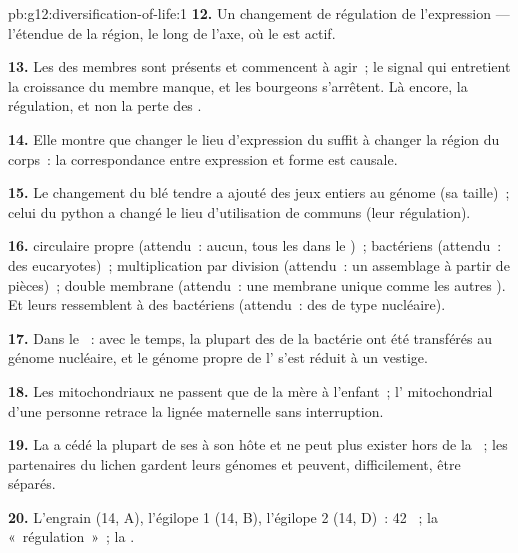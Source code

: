 \begin{solution}{pb:g12:diversification-of-life:1}
\textbf{12.} Un changement de régulation de l'expression --- l'étendue
de la région, le long de l'axe, où le  est actif.

\textbf{13.} Les  des membres sont présents et commencent à agir~;
le signal qui entretient la croissance du membre manque, et les
bourgeons s'arrêtent. Là encore, la régulation, et non la perte des
.

\textbf{14.} Elle montre que changer le lieu d'expression du 
suffit à changer la région du corps~: la correspondance entre
expression et forme est causale.

\textbf{15.} Le changement du blé tendre a ajouté des jeux entiers au
génome (sa taille)~; celui du python a changé le lieu d'utilisation de
 communs (leur régulation).

\textbf{16.}  circulaire propre (attendu~: aucun, tous les 
dans le )~;  bactériens (attendu~: des 
eucaryotes)~; multiplication par division (attendu~: un assemblage à
partir de pièces)~; double membrane (attendu~: une membrane unique
comme les autres ). Et leurs  ressemblent à des 
bactériens (attendu~: des  de type nucléaire).

\textbf{17.} Dans le ~: avec le temps, la plupart des  de la
bactérie ont été transférés au génome nucléaire, et le génome propre de
l' s'est réduit à un vestige.

\textbf{18.} Les  mitochondriaux ne passent que de la mère à
l'enfant~; l' mitochondrial d'une personne retrace la lignée
maternelle sans interruption.

\textbf{19.} La  a cédé la plupart de ses  à son hôte
et ne peut plus exister hors de la ~; les partenaires du lichen
gardent leurs génomes et peuvent, difficilement, être séparés.

\textbf{20.} L'engrain (14, A), l'égilope 1 (14, B), l'égilope 2 (14,
D)~: 42 ~; la «~régulation~»~; la .
\end{solution}

